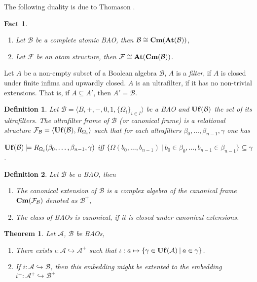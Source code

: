 \documentclass[a4paper]{article}
\theoremstyle{defin}
\newtheorem{defin}{Definition}
\theoremstyle{theorem}
\newtheorem{theorem}{Theorem}
\theoremstyle{prop}
\theoremstyle{lemma}
\theoremstyle{fact}
\newtheorem{fact}{Fact}
\theoremstyle{ex}
\theoremstyle{col}
\begin{document}
The following duality is due to Thomason \cite{thomason1975categories}.

\begin{fact}
  $ $

  \begin{enumerate}
    \item Let $\mathcal{B}$ be a complete atomic BAO, then $\mathcal{B} \cong \bf{Cm} (\bf{At}(\mathcal{B}))$,
    \item Let $\mathcal{F}$ be an atom structure, then $\mathcal{F} \cong {\bf At}({\bf Cm}(\mathcal{B}))$.
  \end{enumerate}
\end{fact}

Let $A$ be a non-empty subset of a Boolean algebra $\mathcal{B}$, $A$ is a \emph{filter}, if $A$ is closed under finite infima and upwardly closed. $A$ is an ultrafilter, if it has no non-trivial extensions. That is, if $A \subseteq A'$, then $A' = \mathcal{B}$.

\begin{defin}
  Let $\mathcal{B} = \langle B, +, -, 0, 1, \{ \Omega_i \}_{i \in I} \rangle$ be a BAO and ${\bf Uf}(\mathcal{B})$ the set of its ultrafilters. The ultrafilter frame of $\mathcal{B}$ (or canonical frame) is a relational structure $\mathcal{F}_{\mathcal{B}} = \langle {\bf Uf}(\mathcal{B}), R_{\Omega_i} \rangle$ such that for each ultrafilters $\beta_0, \dots, \beta_{n - 1}, \gamma$ one has
  \begin{center}
    ${\bf Uf}(\mathcal{B}) \models R_{\Omega_i}(\beta_0, \dots, \beta_{n - 1}, \gamma)$ iff $\{ \Omega(b_0, \dots, b_{n - 1}) \: | \: b_0 \in \beta_0, \dots, b_{n - 1} \in \beta_{n - 1}\} \subseteq \gamma$.
  \end{center}
\end{defin}

\begin{defin} Let $\mathcal{B}$ be a BAO, then

  \begin{enumerate}
    \item The canonical extension of $\mathcal{B}$ is a complex algebra of the canonical frame ${\bf Cm}(\mathcal{F}_{\mathcal{B}})$ denoted as $\mathcal{B}^{+}$,
    \item The class of BAOs is canonical, if it is closed under canonical extensions.
  \end{enumerate}
\end{defin}

\begin{theorem} Let $\mathcal{A}$, $\mathcal{B}$ be BAOs,

\begin{enumerate}
  \item There exists $\iota : \mathcal{A} \hookrightarrow \mathcal{A}^{+}$ such that
  $\iota : a \mapsto \{ \gamma \in {\bf Uf}(\mathcal{A}) \: | \: a \in \gamma \}$.
  \item If $i : \mathcal{A} \hookrightarrow \mathcal{B}$, then this embedding might be extented to the embedding
  $i^{+} : \mathcal{A}^{+} \hookrightarrow \mathcal{B}^{+}$
\end{enumerate}
\end{theorem}
\end{document}
